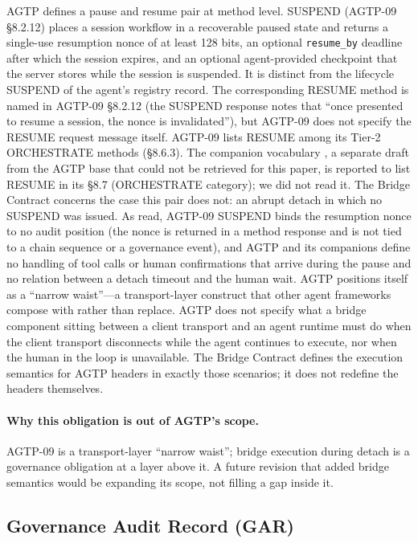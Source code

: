 AGTP defines a pause and resume pair at method level. SUSPEND
(AGTP-09 \S 8.2.12) places a session workflow in a recoverable paused
state and returns a single-use resumption nonce of at least 128 bits,
an optional \texttt{resume\_by} deadline after which the session
expires, and an optional agent-provided checkpoint that the server
stores while the session is suspended. It is distinct from the
lifecycle SUSPEND of the agent's registry record. The corresponding
RESUME method is named in AGTP-09 \S 8.2.12 (the SUSPEND response
notes that ``once presented to resume a session, the nonce is
invalidated''), but AGTP-09 does not specify the RESUME request
message itself. AGTP-09 lists RESUME among its Tier-2 ORCHESTRATE
methods (\S 8.6.3). The companion vocabulary
\cite{I-D.hood-agtp-standard-methods}, a separate draft from the AGTP
base that could not be retrieved for this paper, is reported to list
RESUME in its \S 8.7 (ORCHESTRATE category); we did not read it. The Bridge Contract concerns the
case this pair does not: an abrupt detach in which no SUSPEND was
issued. As read, AGTP-09 SUSPEND binds the resumption nonce to no
audit position (the nonce is returned in a method response and is not
tied to a chain sequence or a governance event), and AGTP and its
companions define no handling of tool calls or human confirmations
that arrive during the pause and no relation between a detach timeout
and the human wait. AGTP positions itself as a ``narrow waist''---a
transport-layer construct that other agent frameworks compose with
rather than replace. AGTP does not specify what a bridge component
sitting between a client transport and an agent runtime must do when the
client transport disconnects while the agent continues to execute, nor
when the human in the loop is unavailable. The Bridge Contract defines
the execution semantics for AGTP headers in exactly those scenarios; it
does not redefine the headers themselves.

\paragraph{Why this obligation is out of AGTP's scope.}
AGTP-09 is a transport-layer ``narrow waist''; bridge execution
during detach is a governance obligation at a layer above it. A
future revision that added bridge semantics would be expanding its
scope, not filling a gap inside it.

\subsection{Governance Audit Record (GAR)}\label{sec:rw-gar}

